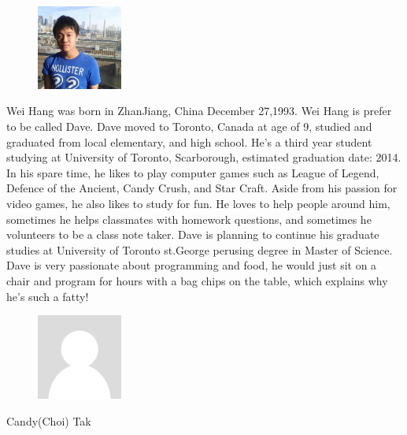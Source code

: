 \documentclass[pdftex,10pt,a4paper]{report}
\begin{document}
\begin{figure}
  \vspace{-20pt}
  \begin{center}
    \includegraphics[width=0.25\textwidth]{img/group/dave}
  \end{center}
  \vspace{-20pt}
\end{figure}
Wei Hang was born in ZhanJiang, China December 27,1993. Wei Hang is prefer to be called Dave. Dave moved to Toronto, Canada at age of 9, studied and graduated from local elementary, and high school. He's a third year student studying at University of Toronto, Scarborough, estimated graduation date: 2014. In his spare time, he likes to play computer games such as League of Legend, Defence of the Ancient, Candy Crush, and Star Craft. Aside from his passion for video games, he also likes to study for fun. He loves to help people around him, sometimes he helps classmates with homework questions, and sometimes he volunteers to be a class note taker. Dave is planning to continue his graduate studies at University of Toronto st.George perusing degree in Master of Science. Dave is very passionate about programming and food, he would just sit on a chair and program for hours with a bag chips on the table, which explains why he's such a fatty! \\

\begin{figure}
  \vspace{-20pt}
  \begin{center}
    \includegraphics[width=0.25\textwidth]{default}
  \end{center}
  \vspace{-20pt}
\end{figure}
Candy(Choi) Tak \lipsum[1]
\end{document}
